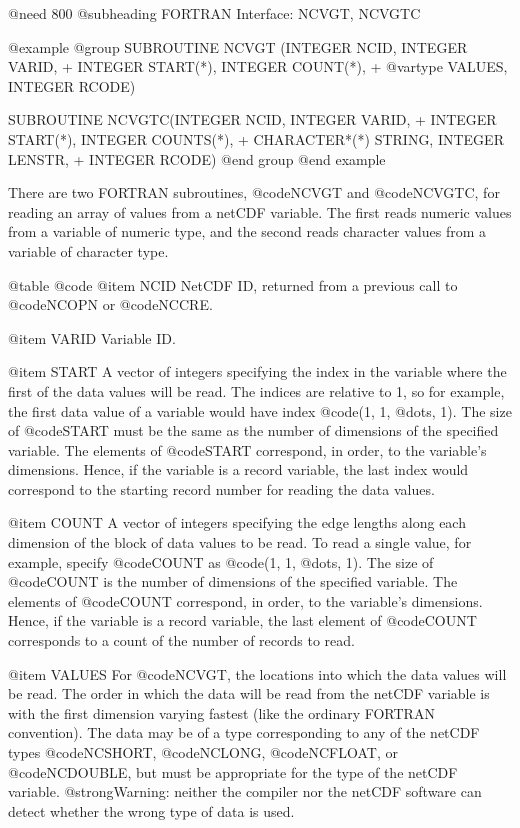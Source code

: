 @need 800
@subheading FORTRAN Interface:  NCVGT, NCVGTC

@example
@group
      SUBROUTINE NCVGT (INTEGER NCID, INTEGER VARID,
     + INTEGER START(*), INTEGER COUNT(*),
     + @var{type} VALUES, INTEGER RCODE)

      SUBROUTINE NCVGTC(INTEGER NCID, INTEGER VARID,
     + INTEGER START(*), INTEGER COUNTS(*),
     + CHARACTER*(*) STRING, INTEGER LENSTR,
     + INTEGER RCODE)
@end group
@end example

There are two FORTRAN subroutines, @code{NCVGT} and @code{NCVGTC}, for
reading an array of values from a netCDF variable.  The first reads
numeric values from a variable of numeric type, and the second reads
character values from a variable of character type.

@table @code
@item NCID
NetCDF ID, returned from a previous call to @code{NCOPN} or
@code{NCCRE}.

@item VARID
Variable ID.

@item START
A vector of integers specifying the index in the
variable where the first of the data values will be read.
The
indices are relative to 1, so for example, the first data value of a
variable would have index @code{(1, 1, @dots{}, 1)}.  The size of
@code{START} must be the same as the number of dimensions of the
specified variable.  The elements of @code{START} correspond, in order, to the
variable's dimensions.  Hence, if the variable is a record
variable, the last index would correspond to the starting record number
for reading the data values.

@item COUNT
A vector of integers specifying the edge lengths along each dimension
of the block of data values to be read.
To read a single value, for example, specify @code{COUNT} as
@code{(1, 1, @dots{}, 1)}.  The size of @code{COUNT} is the number of
dimensions of the specified variable.  The elements of @code{COUNT}
correspond, in order, to the variable's dimensions.  Hence, if the variable is a
record variable, the last element of @code{COUNT} corresponds to a count
of the number of records to read.

@item VALUES
For @code{NCVGT}, the locations into which the data values will be read.
The order in which the data will be read from the netCDF variable is
with the first dimension varying fastest
(like the ordinary FORTRAN convention).  The data may be of a type
corresponding to any of the netCDF types @code{NCSHORT}, @code{NCLONG},
@code{NCFLOAT}, or @code{NCDOUBLE}, but must be appropriate for the type
of the netCDF variable.  @strong{Warning: neither the compiler nor the
netCDF software can detect whether the wrong type of data is used.}

